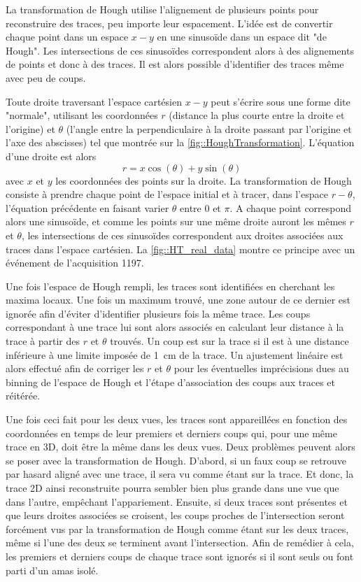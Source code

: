       La transformation de Hough utilise l'alignement de plusieurs points pour reconstruire des traces, peu importe leur espacement. L'idée est de convertir chaque point dans un espace $x-y$ en une sinusoïde dans un espace dit "de Hough". Les intersections de ces sinusoïdes correspondent alors à des alignements de points et donc à des traces. Il est alors possible d'identifier des traces même avec peu de coups.

      Toute droite traversant l'espace cartésien $x-y$ peut s'écrire sous une forme dite "normale", utilisant les coordonnées $r$ (distance la plus courte entre la droite et l'origine) et $\theta$ (l'angle entre la perpendiculaire à la droite passant par l'origine et l'axe des abscisses) tel que montrée sur la \autoref{fig::HoughTransformation}. L'équation d'une droite est alors
      \begin{equation}\label{eq::HT}
        r=x\cos(\theta)+y\sin(\theta)
      \end{equation}
      avec $x$ et $y$ les coordonnées des points sur la droite. La transformation de Hough consiste à prendre chaque point de l'espace initial et à tracer, dans l'espace $r-\theta$, l'équation précédente en faisant varier $\theta$ entre 0 et $\pi$. A chaque point correspond alors une sinusoïde, et comme les points sur une même droite auront les mêmes $r$ et $\theta$, les intersections de ces sinusoïdes correspondent aux droites associées aux traces dans l'espace cartésien. La \autoref{fig::HT_real_data} montre ce principe avec un événement de l'acquisition 1197.

      Une fois l'espace de Hough rempli, les traces sont identifiées en cherchant les maxima locaux. Une fois un maximum trouvé, une zone autour de ce dernier est ignorée afin d'éviter d'identifier plusieurs fois la même trace. Les coups correspondant à une trace lui sont alors associés en calculant leur distance à la trace à partir des $r$ et $\theta$ trouvés. Un coup est sur la trace si il est à une distance inférieure à une limite imposée de \SI{1}{\centi\meter} de la trace. Un ajustement linéaire est alors effectué afin de corriger les $r$ et $\theta$ pour les éventuelles imprécisions dues au binning de l'espace de Hough et l'étape d'association des coups aux traces et réitérée.

      Une fois ceci fait pour les deux vues, les traces sont appareillées en fonction des coordonnées en temps de leur premiers et derniers coups qui, pour une même trace en 3D, doit être la même dans les deux vues. Deux problèmes peuvent alors se poser avec la transformation de Hough. D'abord, si un faux coup se retrouve par hasard aligné avec une trace, il sera vu comme étant sur la trace. Et donc, la trace 2D ainsi reconstruite pourra sembler bien plus grande dans une vue que dans l'autre, empêchant l'appariement. Ensuite, si deux traces sont présentes et que leurs droites associées se croisent, les coups proches de l'intersection seront forcément vus par la transformation de Hough comme étant sur les deux traces, même si l'une des deux se terminent avant l'intersection. Afin de remédier à cela, les premiers et derniers coups de chaque trace sont ignorés si il sont seuls ou font parti d'un amas isolé.

